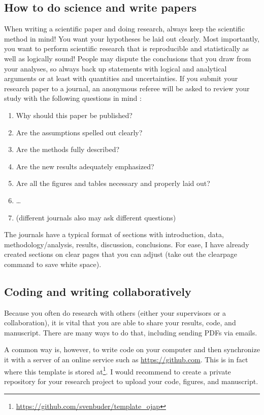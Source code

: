 \documentclass[twocolumn,apj,numberedappendix,appendixfloats]{openjournal}
\begin{document}
\subsection{How to do science and write papers}
When writing a scientific paper and doing research, always keep the scientific method in mind! You want your hypotheses be laid out clearly. Most importantly, you want to perform scientific research that is reproducible and statistically as well as logically sound! People may dispute the conclusions that you draw from your analyses, so always back up statements with logical and analytical arguments or at least with quantities and uncertainties. If you submit your research paper to a journal, an anonymous referee will be asked to review your study with the following questions in mind \citep{Bertout2004}:
\begin{enumerate}
    \item Why should this paper be published?
    \item Are the assumptions spelled out clearly?
    \item Are the methods fully described?
    \item Are the new results adequately emphasized?
    \item Are all the figures and tables necessary and properly laid out?
    \item \dots
    \item (different journals also may ask different questions)
\end{enumerate}

The journals have a typical format of sections with introduction, data, methodology/analysis, results, discussion, conclusions. For ease, I have already created sections on clear pages that you can adjust (take out the clearpage command to save white space).

\subsection{Coding and writing collaboratively}

Because you often do research with others (either your supervisors or a collaboration), it is vital that you are able to share your results, code, and manuscript. There are many ways to do that, including sending PDFs via emails.

A common way is, however, to write code on your computer and then synchronize it with a server of an online service such as \url{https://github.com}. This is in fact where this template is stored at\footnote{\url{https://github.com/svenbuder/template_ojap}}. I would recommend to create a private repository for your research project to upload your code, figures, and manuscript.
\end{document}
